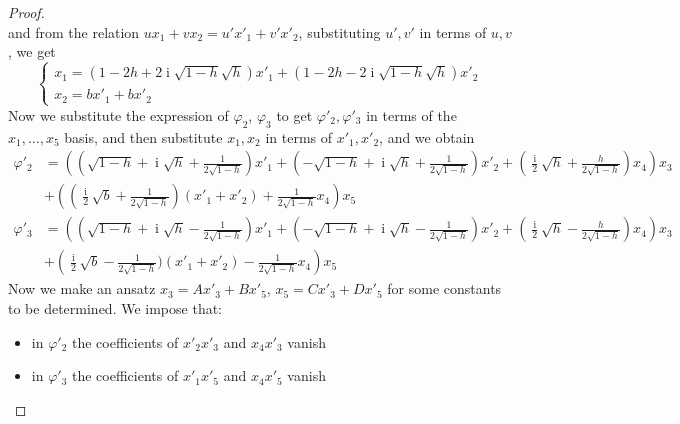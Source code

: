 \documentclass[10pt,reqno]{amsart}
\newcommand{\ii}{\operatorname{i}}
\newcommand{\f}{\varphi}
\theoremstyle{definition}
\begin{document}
\begin{proof}
\[\]
and from the relation $ux_1+vx_2=u'x'_1+v'x'_2$, substituting $u',v'$ in terms of $u,v$, we get
\[
\begin{cases}
    x_1=(1-2h + 2 \ii \sqrt{1-h}\sqrt{h}) x'_1 + ( 1-2h-2 \ii \sqrt{1-h}\sqrt{h}) x'_2
    \\
    x_2=b x'_1 + bx'_2
\end{cases} 
\]
Now we substitute the expression of $\f_2$, $\f_3$ to get $\f'_2, \f'_3$ in terms of the $x_1,\dots , x_5$ basis, and then substitute $x_1, x_2$ in terms of $x'_1, x'_2$, and we obtain
\begin{align*}
    \f'_2 & =\left( (\sqrt{1-h} + \ii \sqrt{h} + \tfrac{1}{2 \sqrt{1-h}}) x'_1 + (-\sqrt{1-h} + \ii \sqrt{h} + \tfrac{1}{2 \sqrt{1-h}})x'_2 + (\tfrac{\ii}{2} \sqrt{h} + \tfrac{h}{2 \sqrt{1-h}})x_4   \right) x_3
    \\
    & + \left((\tfrac{\ii}{2} \sqrt{b} + \tfrac{1}{2 \sqrt{1-h}})(x'_1+x'_2) + \tfrac{1}{2 \sqrt{1-h}} x_4 \right) x_5 \\
    \f'_3 & =\left( (\sqrt{1-h} + \ii \sqrt{h} - \tfrac{1}{2 \sqrt{1-h}}) x'_1 + (-\sqrt{1-h} + \ii \sqrt{h} - \tfrac{1}{2 \sqrt{1-h}})x'_2 + (\tfrac{\ii}{2} \sqrt{h} - \tfrac{h}{2 \sqrt{1-h}})x_4   \right) x_3
    \\
    & + \left(\tfrac{\ii}{2} \sqrt{b} - \tfrac{1}{2 \sqrt{1-h}})(x'_1+x'_2) - \tfrac{1}{2 \sqrt{1-h}} x_4 \right) x_5
\end{align*} 
Now we make an ansatz $x_3=Ax'_3+Bx'_5$, $x_5=Cx'_3+Dx'_5$ for some constants to be determined. We impose that:
\begin{itemize}
    \item in $\f'_2$ the coefficients of $x'_2x'_3$ and $x_4x'_3$ vanish
    \item in $\f'_3$ the coefficients of $x'_1x'_5$ and $x_4x'_5$ vanish
\end{itemize}

\end{proof}
\end{document}
